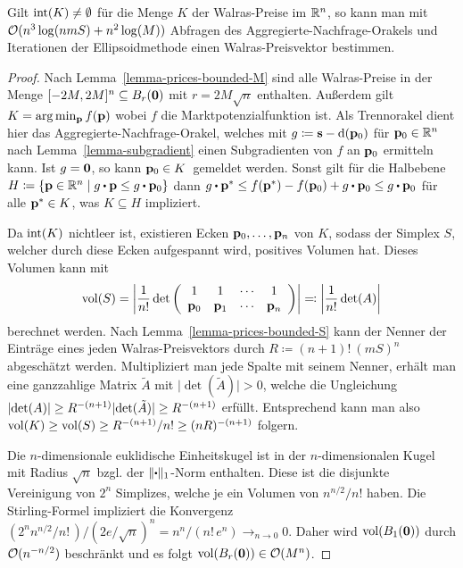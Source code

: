 \begin{theorem}\label{thm-compute-walras-with-ellipsoid}
	Gilt $\operatorname{int}(K) \neq \emptyset$ für die Menge $K$ der Walras-Preise im $\mathbb{R}^n$, so kann man mit $\mathcal{O}(n^3 \log(n m S) + n^2\log(M))$ Abfragen des Aggregierte-Nachfrage-Orakels und Iterationen der Ellipsoidmethode einen Walras-Preisvektor bestimmen.
\end{theorem}
\begin{proof}
	Nach Lemma~\ref{lemma-prices-bounded-M} sind alle Walras-Preise in der Menge $[-2M, 2M]^n\subseteq B_{r}(\mathbf{0})$ mit $r = 2M\sqrt{n}$ enthalten.
	Außerdem gilt $K = \arg\min_{\mathbf{p}} f(\mathbf{p})$ wobei $f$ die Marktpotenzialfunktion ist.
	Als Trennorakel dient hier das Aggregierte-Nachfrage-Orakel, welches mit $g \coloneqq \mathbf{s} - \operatorname{d}(\mathbf{p}_0)$ für $\mathbf{p}_0\in\mathbb{R}^n$ nach Lemma~\ref{lemma-subgradient} einen Subgradienten von $f$ an $\mathbf{p}_0$ ermitteln kann.
	Ist $g = \mathbf{0}$, so kann \glqq$\mathbf{p}_0 \in K$\grqq\ gemeldet werden.
	Sonst gilt für die Halbebene $H\coloneqq\{ \fp\in\R^n \mid g\bcdot \fp \leq g\bcdot \fp_0 \}$ dann $g\bcdot \fp^* \leq f(\fp^*) - f(\fp_0) + g \bcdot \fp_0 \leq g \bcdot \fp_0$ für alle $\mathbf{p}^*\in K$, was $K\subseteq H$ impliziert.
	
	Da $\operatorname{int}(K)$ nichtleer ist, existieren Ecken $\mathbf{p}_0, \dots, \mathbf{p}_n$ von $K$, sodass der Simplex $S$, welcher durch diese Ecken aufgespannt wird, positives Volumen hat.
	Dieses Volumen kann mit
	\[ \operatorname{vol}(S) = \left\lvert  \frac{1}{n!} \det\left(  \begin{array}{ccccc}
		1 & 1 & \cdots & 1 \\	
		\mathbf{p}_0 & \mathbf{p}_1 & \cdots & \mathbf{p}_n
	\end{array}  \right) \right\rvert  \eqqcolon \left\lvert  \frac{1}{n!} \det(A)  \right\rvert \]
	berechnet werden.
	Nach Lemma~\ref{lemma-prices-bounded-S} kann der Nenner der Einträge eines jeden Walras-Preisvektors durch $R \coloneqq (n+1)!\ (mS)^n$ abgeschätzt werden.
	Multipliziert man jede Spalte mit seinem Nenner,
	erhält man eine ganzzahlige Matrix $\tilde{A}$ mit $\lvert \det(\tilde{A}) \rvert > 0$,
	welche die Ungleichung $\left\lvert  \det(A)  \right\rvert \geq R^{-(n+1)} \lvert \det(\tilde{A}) \rvert \geq R^{-(n+1)}$ erfüllt.
	Entsprechend kann man also $\operatorname{vol}(K) \geq \operatorname{vol}(S) \geq R^{-(n+1)} / n! \geq (nR)^{-(n+1)}$ folgern.
	
	Die $n$-dimensionale euklidische Einheitskugel ist in der $n$-dimensionalen Kugel mit Radius $\sqrt{n}$ bzgl. der $\lVert \bcdot \rVert_1$-Norm enthalten.
	Diese ist die disjunkte Vereinigung von $2^n$ Simplizes, welche je ein Volumen von $n^{n/2}/n!$ haben.
	Die Stirling-Formel impliziert die Konvergenz $(2^n n^{n/2}/n!\,)/(2e/\sqrt{n})^{n} = n^n/(n!\, e^n) \rightarrow_{n\rightarrow 0}0$. Daher wird $\operatorname{vol}(B_1(\mathbf{0}))$ durch $\mathcal{O}(n^{-n/2})$ beschränkt und es folgt $\operatorname{vol}(B_r(\mathbf{0}))\in\mathcal{O}(M^n)$.	
	

\end{proof}
